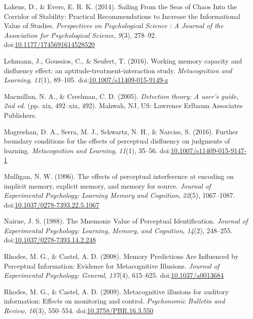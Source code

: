 \documentclass[jou]{apa6}
\begin{document}
\leavevmode\hypertarget{ref-Lakens2014}{}%
Lakens, D., \& Evers, E. R. K. (2014). Sailing From the Seas of Chaos Into the Corridor of Stability: Practical Recommendations to Increase the Informational Value of Studies. \emph{Perspectives on Psychological Science : A Journal of the Association for Psychological Science}, \emph{9}(3), 278--92. doi:\href{https://doi.org/10.1177/1745691614528520}{10.1177/1745691614528520}

\leavevmode\hypertarget{ref-Lehmann2016}{}%
Lehmann, J., Goussios, C., \& Seufert, T. (2016). Working memory capacity and disfluency effect: an aptitude-treatment-interaction study. \emph{Metacognition and Learning}, \emph{11}(1), 89--105. doi:\href{https://doi.org/10.1007/s11409-015-9149-z}{10.1007/s11409-015-9149-z}

\leavevmode\hypertarget{ref-Macmillan2005}{}%
Macmillan, N. A., \& Creelman, C. D. (2005). \emph{Detection theory: A user's guide, 2nd ed.} (pp. xix, 492--xix, 492). Mahwah, NJ, US: Lawrence Erlbaum Associates Publishers.

\leavevmode\hypertarget{ref-Magreehan2016}{}%
Magreehan, D. A., Serra, M. J., Schwartz, N. H., \& Narciss, S. (2016). Further boundary conditions for the effects of perceptual disfluency on judgments of learning. \emph{Metacognition and Learning}, \emph{11}(1), 35--56. doi:\href{https://doi.org/10.1007/s11409-015-9147-1}{10.1007/s11409-015-9147-1}

\leavevmode\hypertarget{ref-Mulligan1996}{}%
Mulligan, N. W. (1996). The effects of perceptual interference at encoding on implicit memory, explicit memory, and memory for source. \emph{Journal of Experimental Psychology: Learning Memory and Cognition}, \emph{22}(5), 1067--1087. doi:\href{https://doi.org/10.1037/0278-7393.22.5.1067}{10.1037/0278-7393.22.5.1067}

\leavevmode\hypertarget{ref-Nairne1988}{}%
Nairne, J. S. (1988). The Mnemonic Value of Perceptual Identification. \emph{Journal of Experimental Psychology: Learning, Memory, and Cognition}, \emph{14}(2), 248--255. doi:\href{https://doi.org/10.1037/0278-7393.14.2.248}{10.1037/0278-7393.14.2.248}

\leavevmode\hypertarget{ref-Rhodes2008}{}%
Rhodes, M. G., \& Castel, A. D. (2008). Memory Predictions Are Influenced by Perceptual Information: Evidence for Metacognitive Illusions. \emph{Journal of Experimental Psychology: General}, \emph{137}(4), 615--625. doi:\href{https://doi.org/10.1037/a0013684}{10.1037/a0013684}

\leavevmode\hypertarget{ref-Rhodes2009}{}%
Rhodes, M. G., \& Castel, A. D. (2009). Metacognitive illusions for auditory information: Effects on monitoring and control. \emph{Psychonomic Bulletin and Review}, \emph{16}(3), 550--554. doi:\href{https://doi.org/10.3758/PBR.16.3.550}{10.3758/PBR.16.3.550}
\end{document}
